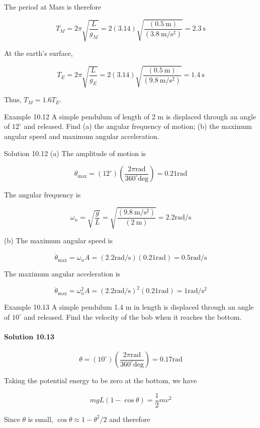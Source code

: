 \documentclass[10pt]{article}
\numberwithin{equation}{section}
\begin{document}
The period at Mars is therefore

$$
T_{M}=2 \pi \sqrt{\frac{L}{g_{M}}}=2(3.14) \sqrt{\frac{(0.5 \mathrm{~m})}{\left(3.8 \mathrm{~m} / \mathrm{s}^{2}\right)}}=2.3 \mathrm{~s}
$$

At the earth's surface,

$$
T_{E}=2 \pi \sqrt{\frac{L}{g_{E}}}=2(3.14) \sqrt{\frac{(0.5 \mathrm{~m})}{\left(9.8 \mathrm{~m} / \mathrm{s}^{2}\right)}}=1.4 \mathrm{~s}
$$

Thus, $T_{M}=1.6 T_{E}$.

Example 10.12 A simple pendulum of length of 2 m is displaced through an angle of $12^{\circ}$ and released. Find (a) the angular frequency of motion; (b) the maximum angular speed and maximum angular acceleration.

Solution 10.12 (a) The amplitude of motion is

$$
\theta_{\max }=\left(12^{\circ}\right)\left(\frac{2 \pi \mathrm{rad}}{360^{\circ} \mathrm{deg}}\right)=0.21 \mathrm{rad}
$$

The angular frequency is

$$
\omega_{n}=\sqrt{\frac{g}{L}}=\sqrt{\frac{\left(9.8 \mathrm{~m} / \mathrm{s}^{2}\right)}{(2 \mathrm{~m})}}=2.2 \mathrm{rad} / \mathrm{s}
$$

(b) The maximum angular speed is

$$
\dot{\theta}_{\max }=\omega_{n} A=(2.2 \mathrm{rad} / \mathrm{s})(0.21 \mathrm{rad})=0.5 \mathrm{rad} / \mathrm{s}
$$

The maximum angular acceleration is

$$
\ddot{\theta}_{\max }=\omega_{n}^{2} A=(2.2 \mathrm{rad} / \mathrm{s})^{2}(0.21 \mathrm{rad})=1 \mathrm{rad} / \mathrm{s}^{2}
$$

Example 10.13 A simple pendulum 1.4 m in length is displaced through an angle of $10^{\circ}$ and released. Find the velocity of the bob when it reaches the bottom.

\paragraph*{Solution 10.13}
$$
\theta=\left(10^{\circ}\right)\left(\frac{2 \pi \mathrm{rad}}{360^{\circ} \mathrm{deg}}\right)=0.17 \mathrm{rad}
$$

Taking the potential energy to be zero at the bottom, we have

$$
m g L(1-\cos \theta)=\frac{1}{2} m v^{2}
$$

Since $\theta$ is small, $\cos \theta \approx 1-\theta^{2} / 2$ and therefore
\end{document}
